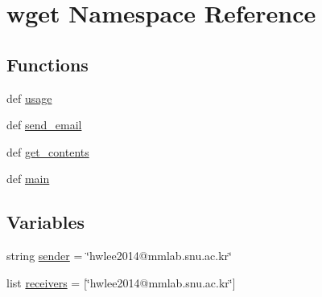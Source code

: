 \hypertarget{namespacewget}{\section{wget Namespace Reference}
\label{namespacewget}
}
\subsection*{Functions}
\begin{DoxyCompactItemize}
\item 
def \hyperlink{namespacewget_a85b0b2e216fe31d86adfd8c410d4fe95}{usage}
\item 
def \hyperlink{namespacewget_ac05f57991e28e302bf7f4e545bc80837}{send\-\_\-email}
\item 
def \hyperlink{namespacewget_a51bc5fef7ec91447f84ae3b493686fcf}{get\-\_\-contents}
\item 
def \hyperlink{namespacewget_ae47ec0ebd83a95e86f03d2d6493eac59}{main}
\end{DoxyCompactItemize}
\subsection*{Variables}
\begin{DoxyCompactItemize}
\item 
string \hyperlink{namespacewget_acf25fe42f54f54315a36328403619b7e}{sender} = \char`\"{}hwlee2014@mmlab.\-snu.\-ac.\-kr\char`\"{}
\item 
list \hyperlink{namespacewget_ad8a4656cb474cdef7bbfc7253795ffa7}{receivers} = \mbox{[}\char`\"{}hwlee2014@mmlab.\-snu.\-ac.\-kr\char`\"{}\mbox{]}
\end{DoxyCompactItemize}


